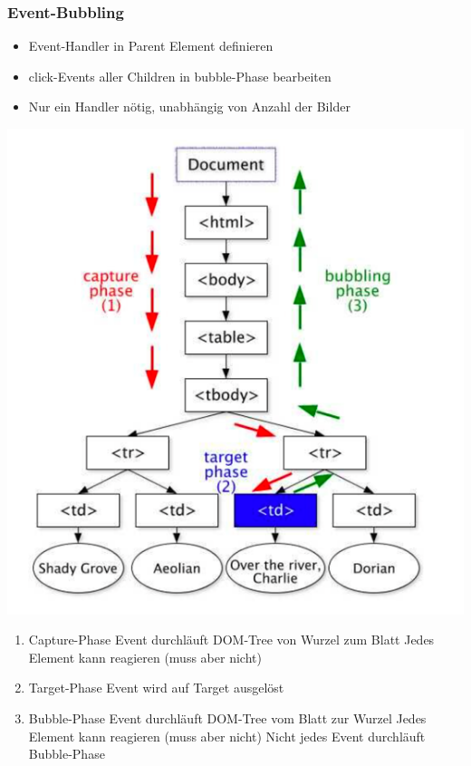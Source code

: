 \documentclass[a4paper, landscape, 8pt]{scrartcl}
\begin{document}
\begin{multicols*}{4}
        \subsubsection{Event-Bubbling}
        \begin{itemize}
            \item Event-Handler in Parent Element definieren
            \item click-Events aller Children in bubble-Phase bearbeiten
            \item Nur ein Handler nötig, unabhängig von Anzahl der Bilder
        \end{itemize}
        \includegraphics[scale=0.3]{graphic/08-event-bubbling}
        \begin{enumerate}
            \item Capture-Phase
            \subitem Event durchläuft DOM-Tree von Wurzel zum Blatt
            \subitem Jedes Element kann reagieren (muss aber nicht)
            \item Target-Phase
            \subitem Event wird auf Target ausgelöst
            \item Bubble-Phase
            \subitem Event durchläuft DOM-Tree vom Blatt zur Wurzel
            \subitem Jedes Element kann reagieren (muss aber nicht)
            \subitem Nicht jedes Event durchläuft Bubble-Phase
        \end{enumerate}


\end{multicols*}
\end{document}
